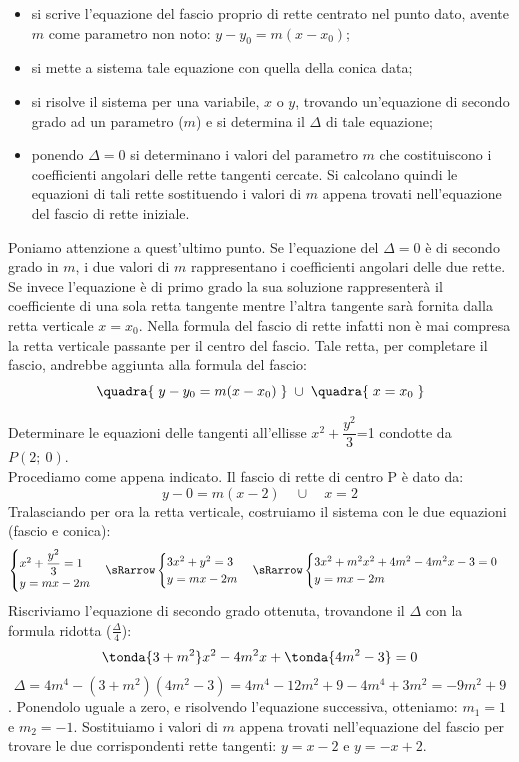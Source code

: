 \begin{itemize} [noitemsep]
  \item si scrive l'equazione del fascio proprio di rette centrato 
nel punto dato, avente $m$ come parametro non noto: $y- y_{0} =m\left(x-x_{0}\right)$;
  \item si mette a sistema tale equazione con quella della conica 
data;
  \item si risolve il sistema per una variabile, $x$ o $y$, trovando un'equazione
  di secondo grado ad un parametro ($m$) e si determina il $ \Delta $ 
di tale equazione;
  \item ponendo $ \Delta =0$ si determinano i valori del parametro $m$ 
che costituiscono i coefficienti angolari delle rette tangenti cercate. Si calcolano quindi
le equazioni di tali rette sostituendo i valori di $m$ appena trovati nell'equazione del fascio di 
rette iniziale.
\end{itemize}

  Poniamo attenzione a quest'ultimo punto. Se l'equazione 
del $ \Delta =0$ è di secondo grado in $m$, i due valori di $m$ rappresentano i 
coefficienti angolari delle due rette. Se invece l'equazione è di 
primo grado la sua soluzione rappresenterà il coefficiente di una sola retta 
tangente mentre l'altra tangente sarà fornita dalla retta verticale $x= 
x_{0} $. Nella formula del fascio di rette infatti non è mai compresa la 
retta verticale passante per il centro del fascio. Tale retta, per 
completare il fascio, andrebbe aggiunta alla formula del fascio:
\[\quadra{\;y-y_{0} =m(x- x_{0} )\;}\; \cup\; \quadra{\;x= x_{0}\;} \]
  

\begin{esempio} Determinare le equazioni delle tangenti 
all'ellisse $ x^{2} + \dfrac{y^{2}}{3} $=1 condotte da $P(2;~0)$.
\\[7pt]
Procediamo come appena indicato. Il fascio di rette di centro 
P è dato da:
\[y-0=m(x-2)\quad \cup  \quad x=2\] 
Tralasciando per ora la retta verticale,
costruiamo il sistema con le due equazioni (fascio e conica):
\[\begin{cases}  x^{2}+\dfrac{y^{2}}{3}=1   \\ y=mx-2m  
\end{cases} \sRarrow  
\begin{cases}  3x^{2}+y^{2}=3   \\ y=mx-2m  
\end{cases} \sRarrow  
\begin{cases}  3x^{2}+m^{2}x^{2}+4m^{2}-4m^{2}x-3=0   \\ y=mx-2m  
\end{cases}\]
Riscriviamo l'equazione di secondo grado ottenuta, trovandone il $\Delta$ 
con la formula ridotta ($\frac{\Delta}{4}$):
\[\tonda{3+ m^{2} } x^{2} -4 m^{2} x+\tonda{4 m^{2} -3}=0\] 
\[\Delta =4 m^{4} -(3+ m^{2} )(4m^{2}-3)=
4 m^{4} -12 m^{2} +9-4 m^{4} +3 m^{2} =-9 m^{2} +9\]. 
Ponendolo uguale a zero, e risolvendo 
l'equazione successiva, otteniamo: \(m_{1} = 1\) e \(m_{2} = -1\).
Sostituiamo i valori di $m$ appena trovati nell'equazione del fascio per trovare le 
due corrispondenti rette tangenti: \(y=x-2\) e \(y=-x+2\).
\end{esempio}

